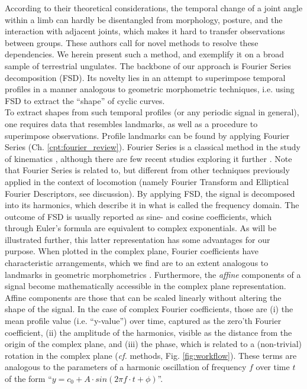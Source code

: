According to their theoretical considerations, the temporal change of a joint angle within a limb can hardly be disentangled from morphology, posture, and the interaction with adjacent joints, which makes it hard to transfer observations between groups.
These authors call for novel methods to resolve these dependencies.
We herein present such a method, and exemplify it on a broad sample of terrestrial ungulates.
The backbone of our approach is Fourier Series decomposition (FSD).
Its novelty lies in an attempt to superimpose temporal profiles in a manner analogous to geometric morphometric techniques, i.e. using FSD to extract the ``shape'' of cyclic curves.
\\To extract shapes from such temporal profiles (or any periodic signal in general), one requires data that resembles landmarks, as well as a procedure to superimpose observations.
Profile landmarks can be found by applying Fourier Series (Ch. \ref{cpt:fourier_review}).
Fourier Series is a classical method in the study of kinematics \citep{Bernstein1927a,Bernstein1935}, although there are few recent studies exploring it further \citep{Pike2002,vanWeeren1992,Grasso2000,Webb2007}.
Note that Fourier Series is related to, but different from other techniques previously applied in the context of locomotion (namely Fourier Transform and Elliptical Fourier Descriptors, see discussion).
By applying FSD, the signal is decomposed into its harmonics, which describe it in what is called the frequency domain.
The outcome of FSD is usually reported as sine- and cosine coefficients, which through Euler's formula are equivalent to complex exponentials.
As will be illustrated further, this latter representation has some advantages for our purpose.
When plotted in the complex plane, Fourier coefficients have characteristic arrangements, which we find are to an extent analogous to landmarks in geometric morphometrics \citep{Bookstein1991,Kendall1989}.
Furthermore, the \textit{affine} components of a signal become mathematically accessible in the complex plane representation.
Affine components are those that can be scaled linearly without altering the shape of the signal.
In the case of complex Fourier coefficients, those are (i) the mean profile value (i.e. ``y-value'') over time, captured as the zero'th Fourier coefficient, (ii) the amplitude of the harmonics, visible as the distance from the origin of the complex plane, and (iii) the phase, which is related to a (non-trivial) rotation in the complex plane (\textit{cf.} methods, Fig. \ref{fig:workflow}).
These terms are analogous to the parameters of a harmonic oscillation of frequency $f$ over time $t$ of the form ``$y = c_0 + A\cdot sin(2\pi f\cdot t + \phi)$''.
